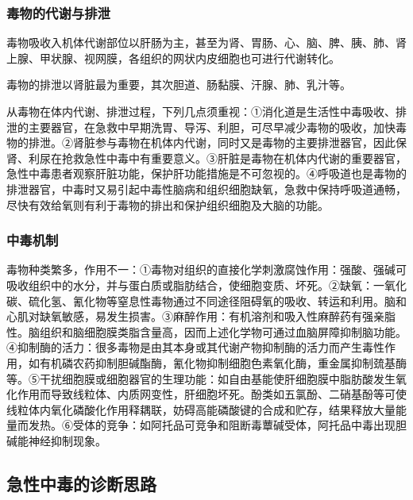 \subsubsection{毒物的代谢与排泄}

毒物吸收入机体代谢部位以肝肠为主，甚至为肾、胃肠、心、脑、脾、胰、肺、肾上腺、甲状腺、视网膜，各组织的网状内皮细胞也可进行代谢转化。

毒物的排泄以肾脏最为重要，其次胆道、肠黏膜、汗腺、肺、乳汁等。

从毒物在体内代谢、排泄过程，下列几点须重视：①消化道是生活性中毒吸收、排泄的主要器官，在急救中早期洗胃、导泻、利胆，可尽早减少毒物的吸收，加快毒物的排泄。②肾脏参与毒物在机体内代谢，同时又是毒物的主要排泄器官，因此保肾、利尿在抢救急性中毒中有重要意义。③肝脏是毒物在机体内代谢的重要器官，急性中毒患者观察肝脏功能，保护肝功能措施是不可忽视的。④呼吸道也是毒物的排泄器官，中毒时又易引起中毒性脑病和组织细胞缺氧，急救中保持呼吸道通畅，尽快有效给氧则有利于毒物的排出和保护组织细胞及大脑的功能。

\subsubsection{中毒机制}

毒物种类繁多，作用不一：①毒物对组织的直接化学刺激腐蚀作用：强酸、强碱可吸收组织中的水分，并与蛋白质或脂肪结合，使细胞变质、坏死。②缺氧：一氧化碳、硫化氢、氰化物等窒息性毒物通过不同途径阻碍氧的吸收、转运和利用。脑和心肌对缺氧敏感，易发生损害。③麻醉作用：有机溶剂和吸入性麻醉药有强亲脂性。脑组织和脑细胞膜类脂含量高，因而上述化学物可通过血脑屏障抑制脑功能。④抑制酶的活力：很多毒物是由其本身或其代谢产物抑制酶的活力而产生毒性作用，如有机磷农药抑制胆碱酯酶，氰化物抑制细胞色素氧化酶，重金属抑制巯基酶等。⑤干扰细胞膜或细胞器官的生理功能：如自由基能使肝细胞膜中脂肪酸发生氧化作用而导致线粒体、内质网变性，肝细胞坏死。酚类如五氯酚、二硝基酚等可使线粒体内氧化磷酸化作用释耦联，妨碍高能磷酸键的合成和贮存，结果释放大量能量而发热。⑥受体的竞争：如阿托品可竞争和阻断毒蕈碱受体，阿托品中毒出现胆碱能神经抑制现象。

\subsection{急性中毒的诊断思路}

